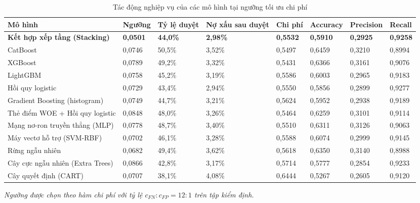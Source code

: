 \begin{table}[!htbp]
\centering
\caption{Tác động nghiệp vụ của các mô hình tại ngưỡng tối ưu chi phí}
\label{tab:model-business}
\small
\setlength{\tabcolsep}{3.0pt}
\begin{tabular}{@{}L{2.718cm}R{1.500cm}R{1.521cm}R{1.565cm}R{1.500cm}R{1.750cm}R{1.750cm}R{1.521cm}@{}}
\toprule
\textbf{Mô hình} & \textbf{Ngưỡng} & \textbf{Tỷ lệ duyệt} & \textbf{Nợ xấu sau duyệt} & \textbf{Chi phí} & \textbf{Accuracy} & \textbf{Precision} & \textbf{Recall} \\
\midrule
\textbf{Kết hợp xếp tầng (Stacking)} & \textbf{0,0501} & \textbf{44,0\%} & \textbf{2,98\%} & \textbf{0,5532} & \textbf{0,5910} & \textbf{0,2925} & \textbf{0,9258} \\
CatBoost & 0,0746 & 50,5\% & 3,52\% & 0,5497 & 0,6459 & 0,3210 & 0,8994 \\
XGBoost & 0,0789 & 49,2\% & 3,32\% & 0,5431 & 0,6366 & 0,3161 & 0,9076 \\
LightGBM & 0,0758 & 45,2\% & 3,19\% & 0,5586 & 0,6003 & 0,2965 & 0,9183 \\
Hồi quy logistic & 0,0729 & 43,4\% & 2,94\% & 0,5550 & 0,5856 & 0,2899 & 0,9277 \\
Gradient Boosting (histogram) & 0,0749 & 44,7\% & 3,21\% & 0,5624 & 0,5952 & 0,2938 & 0,9189 \\
Thẻ điểm WOE + Hồi quy logistic & 0,0848 & 48,0\% & 3,26\% & 0,5464 & 0,6259 & 0,3101 & 0,9114 \\
Mạng nơ-ron truyền thẳng (MLP) & 0,0778 & 48,7\% & 3,40\% & 0,5510 & 0,6311 & 0,3126 & 0,9063 \\
Máy vectơ hỗ trợ (SVM-RBF) & 0,0702 & 46,1\% & 3,28\% & 0,5588 & 0,6074 & 0,2999 & 0,9145 \\
Rừng ngẫu nhiên & 0,0682 & 49,4\% & 3,62\% & 0,5618 & 0,6350 & 0,3140 & 0,8988 \\
Cây cực ngẫu nhiên (Extra Trees) & 0,0866 & 42,8\% & 3,17\% & 0,5714 & 0,5777 & 0,2854 & 0,9233 \\
Cây quyết định (CART) & 0,0707 & 38,1\% & 4,08\% & 0,6444 & 0,5267 & 0,2605 & 0,9120 \\
\bottomrule
\end{tabular}

\vspace{2pt}
{\footnotesize\itshape Ngưỡng được chọn theo hàm chi phí với tỷ lệ $c_{FN}:c_{FP} = 12:1$ trên tập kiểm định.}
\end{table}
